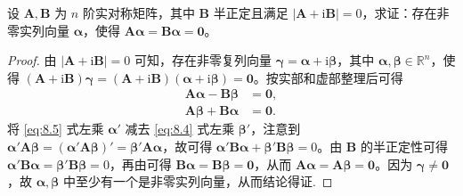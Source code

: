 \documentclass[../../main.tex]{subfiles}
\begin{document}
\begin{proposition}\label{proposition:}
设 $\boldsymbol{A},\boldsymbol{B}$ 为 $n$ 阶实对称矩阵，其中 $\boldsymbol{B}$ 半正定且满足 $|\boldsymbol{A}+\mathrm{i}\boldsymbol{B}| = 0$，求证：存在非零实列向量 $\boldsymbol{\alpha}$，使得 $\boldsymbol{A}\boldsymbol{\alpha}=\boldsymbol{B}\boldsymbol{\alpha}=\boldsymbol{0}$。
\end{proposition}
\begin{proof}
由 $|\boldsymbol{A}+\mathrm{i}\boldsymbol{B}| = 0$ 可知，存在非零复列向量 $\boldsymbol{\gamma}=\boldsymbol{\alpha}+\mathrm{i}\boldsymbol{\beta}$，其中 $\boldsymbol{\alpha},\boldsymbol{\beta}\in\mathbb{R}^n$，使得 $(\boldsymbol{A}+\mathrm{i}\boldsymbol{B})\boldsymbol{\gamma}=(\boldsymbol{A}+\mathrm{i}\boldsymbol{B})(\boldsymbol{\alpha}+\mathrm{i}\boldsymbol{\beta})=\boldsymbol{0}$。按实部和虚部整理后可得
\begin{align}
\boldsymbol{A}\boldsymbol{\alpha}-\boldsymbol{B}\boldsymbol{\beta}&=\boldsymbol{0}, \label{eq:8.4}\\
\boldsymbol{A}\boldsymbol{\beta}+\boldsymbol{B}\boldsymbol{\alpha}&=\boldsymbol{0}. \label{eq:8.5}
\end{align}
将 \eqref{eq:8.5} 式左乘 $\boldsymbol{\alpha}'$ 减去 \eqref{eq:8.4} 式左乘 $\boldsymbol{\beta}'$，注意到 $\boldsymbol{\alpha}'\boldsymbol{A}\boldsymbol{\beta}=(\boldsymbol{\alpha}'\boldsymbol{A}\boldsymbol{\beta})'=\boldsymbol{\beta}'\boldsymbol{A}\boldsymbol{\alpha}$，故可得 $\boldsymbol{\alpha}'\boldsymbol{B}\boldsymbol{\alpha}+\boldsymbol{\beta}'\boldsymbol{B}\boldsymbol{\beta}=0$。由 $\boldsymbol{B}$ 的半正定性可得 $\boldsymbol{\alpha}'\boldsymbol{B}\boldsymbol{\alpha}=\boldsymbol{\beta}'\boldsymbol{B}\boldsymbol{\beta}=0$，再由可得 $\boldsymbol{B}\boldsymbol{\alpha}=\boldsymbol{B}\boldsymbol{\beta}=\boldsymbol{0}$，从而 $\boldsymbol{A}\boldsymbol{\alpha}=\boldsymbol{A}\boldsymbol{\beta}=\boldsymbol{0}$。因为 $\boldsymbol{\gamma}\neq\boldsymbol{0}$，故 $\boldsymbol{\alpha},\boldsymbol{\beta}$ 中至少有一个是非零实列向量，从而结论得证.
\end{proof}
\end{document}
